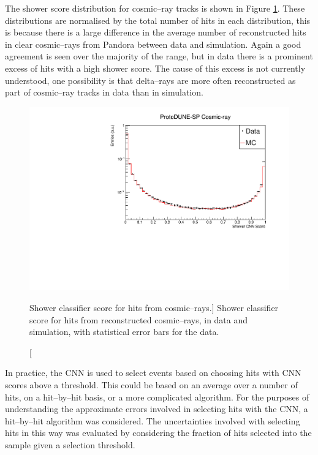 The shower score distribution for cosmic--ray tracks is shown in Figure
\ref{fig:cosmic_muon_cnn}. These distributions are normalised by the total
number of hits in each distribution, this is because there is a large difference
in the average number of reconstructed hits in clear cosmic--rays from Pandora
between data and simulation. Again a good agreement is seen over the majority 
of the range, but in data there is a prominent excess of hits with a high 
shower score. The cause of this excess is not currently understood, one
possibility is that delta--rays are more often reconstructed as part of
cosmic--ray tracks in data than in simulation.

\begin{figure}
	\centering
	\includegraphics[width=\textwidth]{figures/hit_cnn_cosmics.pdf}
	\caption
	[Shower classifier score for hits from cosmic--rays.]
	{Shower classifier score for hits from reconstructed cosmic--rays, in data and
	simulation, with statistical error bars for the data.}
	\label{fig:cosmic_muon_cnn}
\end{figure}

\medskip\noindent
In practice, the CNN is used to select events based on choosing hits with 
CNN scores above a threshold. This could be based on an average over a number 
of hits, on a hit--by--hit basis, or a more complicated algorithm. For the 
purposes of understanding the approximate errors involved in selecting hits 
with the CNN, a hit--by--hit algorithm was considered. The uncertainties 
involved with selecting hits in this way was evaluated by considering the 
fraction of hits selected into the sample given a selection threshold. 

